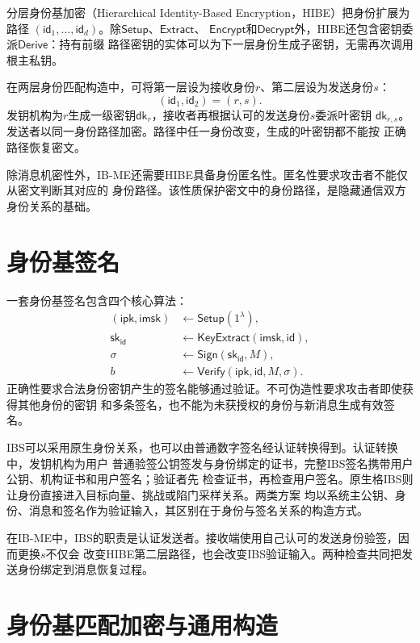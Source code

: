 \begin{mathchapterlayout}
分层身份基加密（Hierarchical Identity-Based Encryption，HIBE）把身份扩展为路径
$(\mathsf{id}_1,\ldots,\mathsf{id}_d)$。除$\mathsf{Setup}$、$\mathsf{Extract}$、
$\mathsf{Encrypt}$和$\mathsf{Decrypt}$外，HIBE还包含密钥委派$\mathsf{Derive}$：持有前缀
路径密钥的实体可以为下一层身份生成子密钥，无需再次调用根主私钥。

在两层身份匹配构造中，可将第一层设为接收身份$r$、第二层设为发送身份$s$：
\[
  (\mathsf{id}_1,\mathsf{id}_2)=(r,s).
\]
发钥机构为$r$生成一级密钥$\mathsf{dk}_r$，接收者再根据认可的发送身份$s$委派叶密钥
$\mathsf{dk}_{r,s}$。发送者以同一身份路径加密。路径中任一身份改变，生成的叶密钥都不能按
正确路径恢复密文。

除消息机密性外，IB-ME还需要HIBE具备身份匿名性。匿名性要求攻击者不能仅从密文判断其对应的
身份路径。该性质保护密文中的身份路径，是隐藏通信双方身份关系的基础。

\section{身份基签名}

一套身份基签名包含四个核心算法：
\[
\begin{aligned}
 (\mathsf{ipk},\mathsf{imsk})&\leftarrow\mathsf{Setup}(1^\lambda),\\
 \mathsf{sk}_{\mathsf{id}}&\leftarrow\mathsf{KeyExtract}(\mathsf{imsk},\mathsf{id}),\\
 \sigma&\leftarrow\mathsf{Sign}(\mathsf{sk}_{\mathsf{id}},M),\\
 b&\leftarrow\mathsf{Verify}(\mathsf{ipk},\mathsf{id},M,\sigma).
\end{aligned}
\]
正确性要求合法身份密钥产生的签名能够通过验证。不可伪造性要求攻击者即使获得其他身份的密钥
和多条签名，也不能为未获授权的身份与新消息生成有效签名。

IBS可以采用原生身份关系，也可以由普通数字签名经认证转换得到。认证转换中，发钥机构为用户
普通验签公钥签发与身份绑定的证书，完整IBS签名携带用户公钥、机构证书和用户签名；验证者先
检查证书，再检查用户签名。原生格IBS则让身份直接进入目标向量、挑战或陷门采样关系。两类方案
均以系统主公钥、身份、消息和签名作为验证输入，其区别在于身份与签名关系的构造方式。

在IB-ME中，IBS的职责是认证发送者。接收端使用自己认可的发送身份验签，因而更换$s$不仅会
改变HIBE第二层路径，也会改变IBS验证输入。两种检查共同把发送身份绑定到消息恢复过程。

\section{身份基匹配加密与通用构造}


\end{mathchapterlayout}
